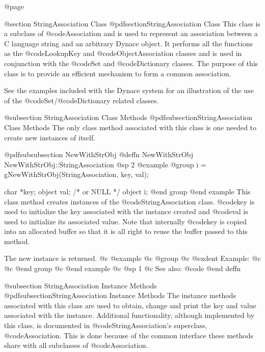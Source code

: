 @page

@section StringAssociation Class
@pdfsection{StringAssociation Class}
This class is a subclass of @code{Association} and is used to
represent an association between a C language string and an arbitrary
Dynace object.  It performs all the functions as the @code{LookupKey}
and @code{ObjectAssociation} classes and is used in conjunction with the
@code{Set} and @code{Dictionary} classes.  The purpose of this class is
to provide an efficient mechanism to form a common association.


See the examples included with the Dynace system for an illustration of the
use of the @code{Set}/@code{Dictionary} related classes.


@subsection StringAssociation Class Methods
@pdfsubsection{StringAssociation Class Methods}
The only class method associated with this class is one needed to create
new instances of itself.






@pdfsubsubsection {NewWithStrObj}
@deffn {NewWithStrObj} NewWithStrObj::StringAssociation
@sp 2
@example
@group
i = gNewWithStrObj(StringAssociation, key, val);

char    *key;
object  val;    /*  or NULL   */
object  i;
@end group
@end example
This class method creates instances of the @code{StringAssociation}
class.  @code{key} is used to initialize the key associated with the
instance created and @code{val} is used to initialize its associated
value.  Note that internally @code{key} is copied into an allocated
buffer so that it is all right to reuse the buffer passed to this
method.

The new instance is returned.
@c @example
@c @group
@c @exdent Example:
@c 
@c @end group
@c @end example
@c @sp 1
@c See also:  @code{}
@end deffn



@subsection StringAssociation Instance Methods
@pdfsubsection{StringAssociation Instance Methods}
The instance methods associated with this class are used to obtain,
change and print the key and value associated with the instance.
Additional functionality, although implemented by this class, is documented
in @code{StringAssociation}'s superclass, @code{Association}.  This is done
because of the common interface these methods share with all subclasses
of @code{Association}.












